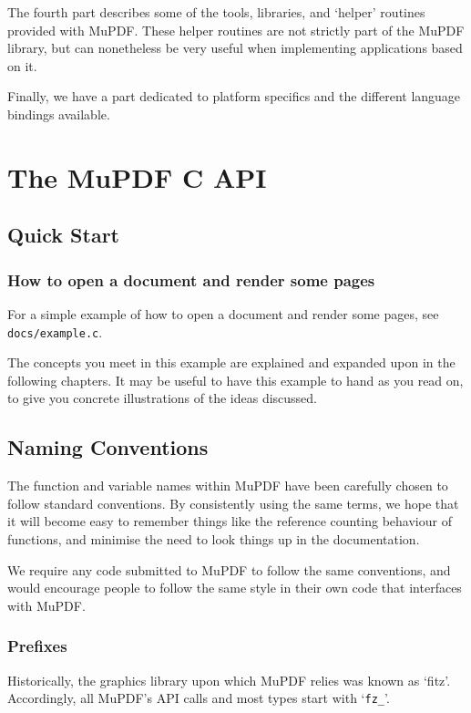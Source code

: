 \documentclass[oneside]{book}
\begin{document}
The fourth part describes some of the tools, libraries, and `helper' routines provided with MuPDF. These helper routines are not strictly part of the MuPDF library, but can nonetheless be very useful when implementing applications based on it. 

Finally, we have a part dedicated to platform specifics and the different language bindings available.

\part{The MuPDF C API}

\chapter{Quick Start}

\section{How to open a document and render some pages}

For a simple example of how to open a document and render some pages, see \texttt{docs/example.c}.

The concepts you meet in this example are explained and expanded upon in the following chapters. It may be useful to have this example to hand as you read on, to give you concrete illustrations of the ideas discussed.


\chapter{Naming Conventions}

The function and variable names within MuPDF have been carefully chosen to follow standard conventions. By consistently using the same terms, we hope that it will become easy to remember things like the reference counting behaviour of functions, and minimise the need to look things up in the documentation.

We require any code submitted to MuPDF to follow the same conventions, and would encourage people to follow the same style in their own code that interfaces with MuPDF.

\section{Prefixes}

Historically, the graphics library upon which MuPDF relies was known as `fitz'. Accordingly, all MuPDF's API calls and most types start with `\texttt{fz\_}'.
\end{document}
